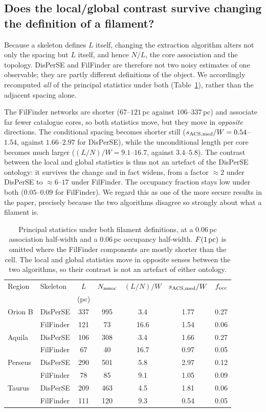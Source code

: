 \documentclass[usenatbib,twoside,twocolumn]{mnras}
\begin{document}
\subsection{Does the local/global contrast survive changing the definition of a filament?}
\label{sec:ontology}
Because a skeleton defines $L$ itself, changing the extraction algorithm alters not only the spacing but $L$ itself, and hence $N/L$, the core association and the topology. DisPerSE and FilFinder are therefore not two noisy estimates of one observable; they are partly different definitions of the object. We accordingly recomputed \emph{all} of the principal statistics under both (Table~\ref{tab:ontology}), rather than the adjacent spacing alone.

The FilFinder networks are shorter ($67$--$121$\,pc against $106$--$337$\,pc) and associate far fewer catalogue cores, so both statistics move, but they move in \emph{opposite} directions. The conditional spacing becomes shorter still ($s_{\rm ACS,med}/W=0.54$--$1.54$, against $1.66$--$2.97$ for DisPerSE), while the unconditional length per core becomes much larger ($(L/N)/W=9.1$--$16.7$, against $3.4$--$5.8$). The contrast between the local and global statistics is thus not an artefact of the DisPerSE ontology: it survives the change and in fact widens, from a factor $\approx2$ under DisPerSE to $\approx6$--$17$ under FilFinder. The occupancy fraction stays low under both ($0.05$--$0.09$ for FilFinder). We regard this as one of the more secure results in the paper, precisely because the two algorithms disagree so strongly about what a filament is.

\begin{table}
\caption{Principal statistics under both filament definitions, at a $0.06$\,pc association half-width and a $0.06$\,pc occupancy half-width. $F(1\,{\rm pc})$ is omitted where the FilFinder components are mostly shorter than the cell. The local and global statistics move in opposite senses between the two algorithms, so their contrast is not an artefact of either ontology.}
\label{tab:ontology}
\footnotesize
\setlength{\tabcolsep}{3pt}
\begin{tabular}{llccccc}
\toprule
Region & Skeleton & $L$ & $N_{\rm assoc}$ & $(L/N)/W$ & $s_{\rm ACS,med}/W$ & $f_{\rm occ}$ \\
 & & (pc) & & & & \\
\midrule
Orion B & DisPerSE  & 337 & 995 & 3.4 & 1.77 & 0.27 \\
        & FilFinder & 121 &  73 & 16.6 & 1.54 & 0.06 \\
Aquila  & DisPerSE  & 106 & 308 & 3.4 & 1.66 & 0.27 \\
        & FilFinder &  67 &  40 & 16.7 & 0.97 & 0.05 \\
Perseus & DisPerSE  & 290 & 501 & 5.8 & 2.97 & 0.12 \\
        & FilFinder &  78 &  85 &  9.1 & 1.05 & 0.09 \\
Taurus  & DisPerSE  & 209 & 463 & 4.5 & 1.81 & 0.06 \\
        & FilFinder & 111 & 120 &  9.3 & 0.54 & 0.05 \\
\bottomrule
\end{tabular}
\end{table}
\end{document}

